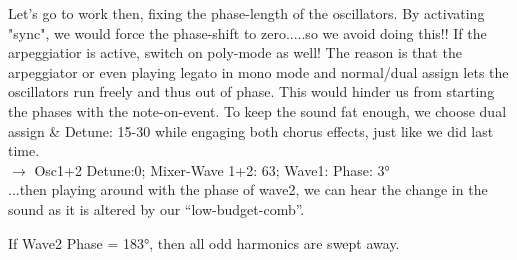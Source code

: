 Let’s go to work then, fixing the phase-length of the oscillators. By activating "sync", we would force the phase-shift to zero.....so we avoid doing this!!
If the arpeggiatior is active, switch on poly-mode as well! The reason is that the arpeggiator or even playing legato in mono mode and normal/dual assign lets the oscillators run freely and thus out of phase. This would hinder us from starting the phases with the note-on-event. To keep the sound fat enough, we choose dual assign \& Detune: 15-30 while engaging both chorus effects, just like we did last time.\\
$\to$ Osc1+2 Detune:0; Mixer-Wave 1+2: 63; Wave1: Phase: 3°\\
...then playing around with the phase of wave2, we can hear the change in the sound as it is altered by our ``low-budget-comb''. 
\begin{example}
	If Wave2 Phase = 183°, then all odd harmonics are swept away.
\end{example}

